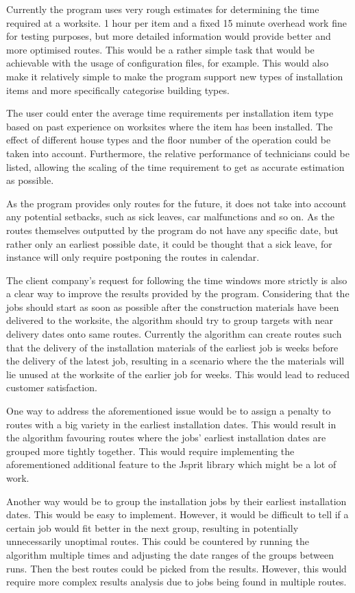 Currently the program uses very rough estimates for determining the time required at a worksite. 1 hour per item and a fixed 15 minute overhead work fine for testing purposes, but more detailed information would provide better and more optimised routes. This would be a rather simple task that would be achievable with the usage of configuration files, for example. This would also make it relatively simple to make the program support new types of installation items and more specifically categorise building types.

The user could enter the average time requirements per installation item type based on past experience on worksites where the item has been installed. The effect of different house types and the floor number of the operation could be taken into account. Furthermore, the relative performance of technicians could be listed, allowing the scaling of the time requirement to get as accurate estimation as possible.

As the program provides only routes for the future, it does not take into account any potential setbacks, such as sick leaves, car malfunctions and so on. As the routes themselves outputted by the program do not have any specific date, but rather only an earliest possible date, it could be thought that a sick leave, for instance will only require postponing the routes in calendar.  

The client company's request for following the time windows more strictly is also a clear way to improve the results provided by the program. Considering that the jobs should start as soon as possible after the construction materials have been delivered to the worksite, the algorithm should try to group targets with near delivery dates onto same routes. Currently the algorithm can create routes such that the delivery of the installation materials of the earliest job is weeks before the delivery of the latest job, resulting in a scenario where the the materials will lie  unused at the worksite of the earlier job for weeks. This would lead to reduced customer satisfaction.

One way to address the aforementioned issue would be to assign a penalty to routes with a big variety in the earliest installation dates. This would result in the algorithm favouring routes where the jobs' earliest installation dates are grouped more tightly together. This would require implementing the aforementioned additional feature to the Jsprit library which might be a lot of work. 

Another way would be to group the installation jobs by their earliest installation dates. This would be easy to implement. However, it would be difficult to tell if a certain job would fit better in the next group, resulting in potentially unnecessarily unoptimal routes. This could be countered by running the algorithm multiple times and adjusting the date ranges of the groups between runs. Then the best routes could be picked from the results. However, this would require more complex results analysis due to jobs being found in multiple routes. 

